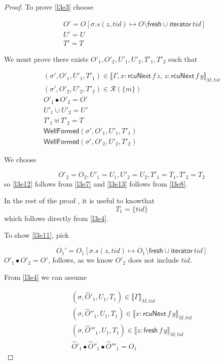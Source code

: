 \begin{proof}
To prove \ref{l3e3} choose

\[
\begin{array}{cl}
&O' = O[\sigma.s(z,tid) \mapsto O  \setminus \mathsf{fresh}  \cup \mathsf{iterator} \, tid]\\
&U' = U\\
&T' = T
\end{array}
\]

We must prove there exists $O'_{1}, O'_{2}, U'_{1}, U'_{2}, T'_{1}, T'_{2}$ such that


\begin{gather}\label{l3e9}
(\sigma',O'_{1},U'_{1}, T'_{1}) \in \llbracket \Gamma,x:\mathsf{rcuNext}\,f \, z , \, z:\mathsf{rcuNext}\,f \, y  \rrbracket_{M,tid}
\\
\label{l3e10}
(\sigma',O'_{2},U'_{2}, T'_{2}) \in \mathcal{R}(\{m\})
\\
 \label{l3e11}
O'_{1} \bullet O'_{2} = O'
\\
 \label{l3e12}
U'_{1} \cup U'_{2} = U' 
\\
 \label{l3e13}
T'_{1} \uplus T'_{2} = T
\\
\label{l3wfp1}
\textsf{WellFormed}(\sigma',O'_{1},U'_{1},T'_{1})
\\
\label{l3wfp2}
\textsf{WellFormed}(\sigma',O'_{2},U'_{2},T'_{2})
\end{gather}

We choose 

\[O'_{2} = O_{2}, U'_{1} = U_{1}, U'_{2} = U_{2}, T'_{1} = T_{1}, T'_{2} = T_{2}  \] so \ref{l3e12} follows from \ref{l3e7} and \ref{l3e13} follows from \ref{l3e8}.

In the rest of the proof , it is useful to knowthat
\begin{equation} \label{l3e14}
T_{1} = \{tid\}
\end{equation}
which follows directly from \ref{l3e4}.

To show \ref{l3e11}, pick

\[O_{1}' = O_{1}[\sigma.s(z,tid) \mapsto O_{1} \setminus \textsf{fresh}  \cup \textsf{iterator} \, tid]\]
$O'_{1} \bullet O'_{2} = O'$, follows, as we know $O'_{2}$ does not include $tid$.


From \ref{l3e4} we can assume

\begin{gather} \label{l3e14}
(\sigma,\hat{O}'_{1},U_{1},T_{1})  \in \llbracket \Gamma \rrbracket_{M,tid}
\\
 \label{l3e15}
(\sigma,\hat{O}''_{1},U_{1},T_{1})  \in \llbracket x:\mathsf{rcuNext} \, f \, y \rrbracket_{M,tid}
\\
\label{l3e16}
(\sigma,\hat{O}'''_{1},U_{1},T_{1}) \in \llbracket z:\mathsf{fresh} \, f \, y \rrbracket_{M,tid}
\\
 \label{l3e17}
\hat{O}'_{1} \bullet \hat{O}''_{1} \bullet \hat{O}'''_{1} = O_{1}
\end{gather}



\end{proof}
